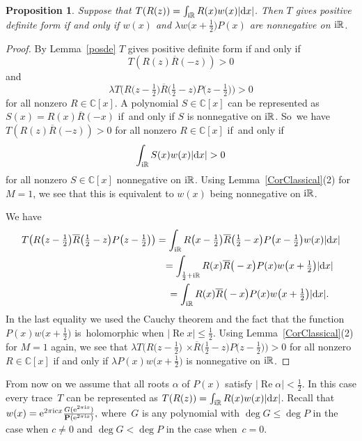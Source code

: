 \documentclass[10pt,a4paper]{amsart}
\newcommand{\RN}{\mathbb{R}} %
\newcommand{\CN}{\mathbb{C}} %
\newcommand{\ovl}{\overline}
\renewcommand{\Re}{\operatorname{Re}}
\newcommand{\bP}{\mathbf{P}}
\newtheorem{Proposition}[Theorem]{Proposition}
\theoremstyle{definition}
\numberwithin{equation}{section}
\begin{document}
\begin{Proposition}
\label{PropFromPositiveTraceToFunctions}
Suppose that $T(R(z))=\int_{{\rm i}\RN}R(x)w(x)|{\rm d}x|$. Then $T$ gives positive definite form if and only if $w(x)$ and $\lambda w\big(x+\frac{1}{2}\big)P(x)$ are nonnegative on ${\rm i}\RN$.
\end{Proposition}
\begin{proof} By Lemma~\ref{posde}
$T$ gives positive definite form if and only if
\[
T(R(z)\ovl{R}(-z))>0
\]
and
\[
\lambda T\big(R\big(z-\tfrac{1}{2}\big)\ovl{R}\big(\tfrac{1}{2}-z\big)P\big(z-\tfrac{1}{2}\big)\big)>0
\]
for all nonzero $R\in \CN[x]$. A polynomial $S\in \CN[x]$ can be represented as $S(x)=R(x)\ovl{R}(-x)$ if~and only if $S$ is nonnegative on ${\rm i}\RN$. So~we have $T(R(z)\ovl{R}(-z))>0$ for all nonzero $R\in \CN[x]$ if~and only if
\[
\int_{{\rm i}\RN}S(x)w(x)|{\rm d}x|>0
\]
for all nonzero $S\in \CN[x]$ nonnegative on ${\rm i}\RN$. Using Lemma~\ref{CorClassical}(2) for $M=1$, we see that this is equivalent to $w(x)$ being nonnegative on ${\rm i}\RN$.

We have
\begin{gather*}
T\big(R\big(z-\tfrac{1}{2}\big)\ovl{R}\big(\tfrac{1}{2}-z\big)P\big(z-\tfrac{1}{2}\big)\big)=\int_{{\rm i}\RN}R\big(x-\tfrac{1}{2}\big)\ovl{R}\big(\tfrac{1}{2}-x\big)P\big(x-\tfrac{1}{2}\big)w(x)|{\rm d}x|
\\ \hphantom{T\big(R\big(z-\tfrac{1}{2}\big)\ovl{R}\big(\tfrac{1}{2}-z\big)P\big(z-\tfrac{1}{2}\big)\big)}
{}=\int_{\frac{1}{2}+{\rm i}\RN}R(x)\ovl{R}\big(-x\big)P(x)w\big(x+\tfrac{1}{2}\big)|{\rm d}x|
\\ \hphantom{T\big(R\big(z-\tfrac{1}{2}\big)\ovl{R}\big(\tfrac{1}{2}-z\big)P\big(z-\tfrac{1}{2}\big)\big)}
{}=\int_{{\rm i}\RN}R(x)\ovl{R}\big(-x\big)P(x)w\big(x+\tfrac{1}{2}\big)|{\rm d}x|.
\end{gather*}
In the last equality we used the Cauchy theorem and the fact that the function \mbox{$P(x)w\big(x+\tfrac{1}{2}\big)$} is~holomorphic when $|\Re x|\leq \frac{1}{2}$. Using Lemma~\ref{CorClassical}(2) for $M=1$ again, we see that \mbox{$\lambda T\big(R\big(z-\frac{1}{2}\big)$} $\times\ovl{R}\big(\frac{1}{2}-z\big) P\big(z-\frac{1}{2}\big)\big)>0$ for all nonzero $R\in \CN[x]$ if and only if $\lambda P(x)w\big(x+\frac{1}{2}\big)$ is nonnegative on ${\rm i}\RN$.
\end{proof}

From now on we assume that all roots $\alpha$ of $P(x)$ satisfy $|\Re\alpha|<\frac{1}{2}$. In this case every trace~$T$ can be represented as $T(R(z))=\int_{{\rm i}\RN}R(x)w(x)|{\rm d}x|$.
Recall that $w(x)={\rm e}^{2\pi {\rm i}cx}\frac{G({\rm e}^{2\pi {\rm i} x})}{\bP({\rm e}^{2\pi {\rm i} x})},$ where~$G$ is any polynomial with $\deg G\leq \deg P$ in the case when $c\neq 0$ and $\deg G<\deg P$ in the case when~$c=0$.
\end{document}
